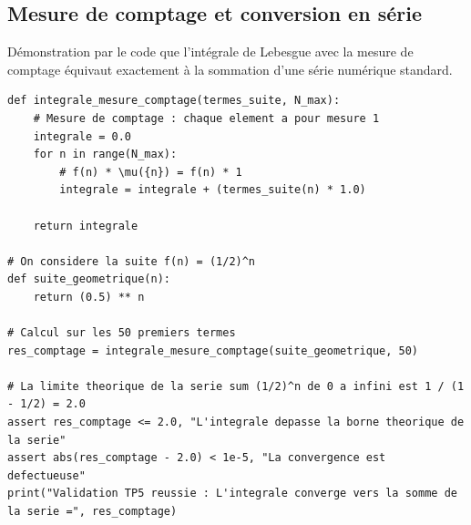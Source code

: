 \documentclass[11pt,a4paper]{article}
\begin{document}
\subsection*{Mesure de comptage et conversion en s\'erie}

D\'emonstration par le code que l'int\'egrale de Lebesgue avec la mesure de comptage \'equivaut exactement \`a la sommation d'une s\'erie num\'erique standard.

\begin{lstlisting}
def integrale_mesure_comptage(termes_suite, N_max):
    # Mesure de comptage : chaque element a pour mesure 1
    integrale = 0.0
    for n in range(N_max):
        # f(n) * \mu({n}) = f(n) * 1
        integrale = integrale + (termes_suite(n) * 1.0)

    return integrale

# On considere la suite f(n) = (1/2)^n
def suite_geometrique(n):
    return (0.5) ** n

# Calcul sur les 50 premiers termes
res_comptage = integrale_mesure_comptage(suite_geometrique, 50)

# La limite theorique de la serie sum (1/2)^n de 0 a infini est 1 / (1 - 1/2) = 2.0
assert res_comptage <= 2.0, "L'integrale depasse la borne theorique de la serie"
assert abs(res_comptage - 2.0) < 1e-5, "La convergence est defectueuse"
print("Validation TP5 reussie : L'integrale converge vers la somme de la serie =", res_comptage)
\end{lstlisting}
\end{document}

